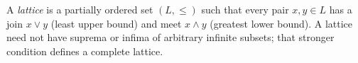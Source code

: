 
A \emph{lattice} is a partially ordered set $(L,\le)$ such that every pair $x,y\in L$ has a join $x\vee y$ (least upper bound) and meet $x\wedge y$ (greatest lower bound). A lattice need not have suprema or infima of arbitrary infinite subsets; that stronger condition defines a complete lattice.
